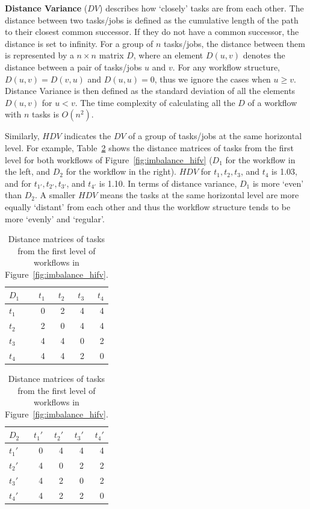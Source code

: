 \textbf{Distance Variance} ($DV$) describes how `closely' tasks are from each other. The distance between two tasks/jobs is defined as the cumulative length of the path to their closest common successor. If they do not have a common successor, the distance is set to infinity. For a group of $n$ tasks/jobs, the distance between them is represented by a $n \times n$ matrix $D$, where an element $D(u,v)$ denotes the distance between a pair of tasks/jobs $u$ and $v$. For any workflow structure, $D(u,v)=D(v,u)$ and $D(u,u)=0$, thus we ignore the cases when $u \geq v$. Distance Variance is then defined as the standard deviation of all the elements $D(u,v)$ for $u<v$. The time complexity of calculating all the $D$ of a workflow with $n$ tasks is $O(n^2)$. 

Similarly, $HDV$ indicates the $DV$ of a group of tasks/jobs at the same horizontal level. For example, Table~\ref{tab:imblance_metric} shows the distance matrices of tasks from the first level for both workflows of Figure~\ref{fig:imbalance_hifv} ($D_1$ for the workflow in the left, and $D_2$ for the workflow in the right). $HDV$ for $t_1, t_2, t_3$, and $t_4$ is 1.03, and for $t_{1'}, t_{2'}, t_{3'}$, and $t_{4'}$ is 1.10. In terms of distance variance, $D_1$ is more `even' than $D_2$. A smaller $HDV$ means the tasks at the same horizontal level are more equally `distant' from each other and thus the workflow structure tends to be more `evenly' and `regular'. 

\begin{table}[htb]
	\footnotesize
	\centering
	\begin{tabular}{l|rrrr}
		$D_1$ & $t_1$ & $t_2$ & $t_3$ &$t_4$\\
		\hline
		$t_1$ & 0 & 2 & 4 & 4 \\
		$t_2$ & 2 & 0 & 4 & 4 \\
		$t_3$ & 4 & 4 & 0 & 2\\
		$t_4$ & 4 & 4 & 2 & 0 \\
	\end{tabular}
	\quad
	\begin{tabular}{l|rrrr}
		$D_2$ & $t_1'$ & $t_2'$ & $t_3'$ &$t_4'$\\
		\hline
		$t_1'$ & 0 & 4 & 4 & 4 \\
		$t_2'$ & 4 & 0 & 2 & 2 \\
		$t_3'$ & 4 & 2 & 0 & 2\\
		$t_4'$ & 4 & 2 & 2 & 0 \\
	\end{tabular}
	\caption{Distance matrices of tasks from the first level of workflows in Figure~\ref{fig:imbalance_hifv}.}
	\label{tab:imblance_metric}
\end{table}


